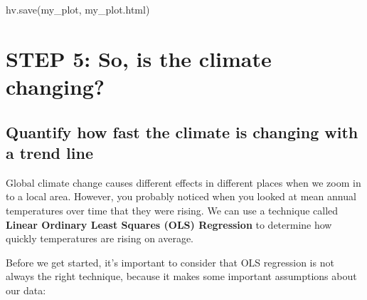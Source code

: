 \documentclass[
  letterpaper,
  DIV=11,
  numbers=noendperiod,
  oneside]{scrreprt}
\newenvironment{Shaded}{\begin{snugshade}}{\end{snugshade}}
\newcommand{\NormalTok}[1]{\textcolor[rgb]{0.00,0.23,0.31}{#1}}
\newcommand{\StringTok}[1]{\textcolor[rgb]{0.13,0.47,0.30}{#1}}
\begin{document}
\begin{Shaded}
\begin{Highlighting}[]
\NormalTok{hv.save(my\_plot, }\StringTok{\textquotesingle{}my\_plot.html\textquotesingle{}}\NormalTok{)}
\end{Highlighting}
\end{Shaded}


\chapter{STEP 5: So, is the climate
changing?}\label{step-5-so-is-the-climate-changing}

\section{Quantify how fast the climate is changing with a trend
line}\label{quantify-how-fast-the-climate-is-changing-with-a-trend-line}

Global climate change causes different effects in different places when
we zoom in to a local area. However, you probably noticed when you
looked at mean annual temperatures over time that they were rising. We
can use a technique called \textbf{Linear Ordinary Least Squares (OLS)
Regression} to determine how quickly temperatures are rising on average.

Before we get started, it's important to consider that OLS regression is
not always the right technique, because it makes some important
assumptions about our data:
\end{document}
